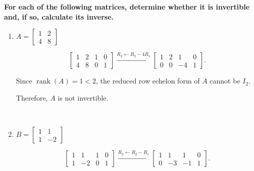 \item \textbf{For each of the following matrices,
determine whether it is invertible and,
if so, calculate its inverse.}

\begin{enumerate}[label=\alph*)]

\item
$A=
\begin{bmatrix}
    1 & 2\\
    4 & 8
\end{bmatrix}
$

\begin{answer}
    $$
    \left[
    \begin{array}{cc|cc}
        1 & 2 & 1 & 0\\
        4 & 8 & 0 & 1
    \end{array}
    \right]
    \xrightarrow{R_2\leftarrow R_2-4R_1}
    \left[
    \begin{array}{cc|cc}
        1 & 2 & 1 & 0\\
        0 & 0 & -4 & 1
    \end{array}
    \right].
    $$

    Since $\operatorname{rank}(A)=1<2$,
    the reduced row echelon form of $A$
    cannot be $I_2$.

    Therefore, $A$ is not invertible.

\end{answer} \\[0.5em]

\item
$B=
\begin{bmatrix}
    1 & 1\\
    1 & -2
\end{bmatrix}
$

\begin{answer}
    $$
    \left[
    \begin{array}{cc|cc}
        1 & 1 & 1 & 0\\
        1 & -2 & 0 & 1
    \end{array}
    \right]
    \xrightarrow{R_2\leftarrow R_2-R_1}
    \left[
    \begin{array}{cc|cc}
        1 & 1 & 1 & 0\\
        0 & -3 & -1 & 1
    \end{array}
    \right].
    $$


\end{answer}
\end{enumerate}

